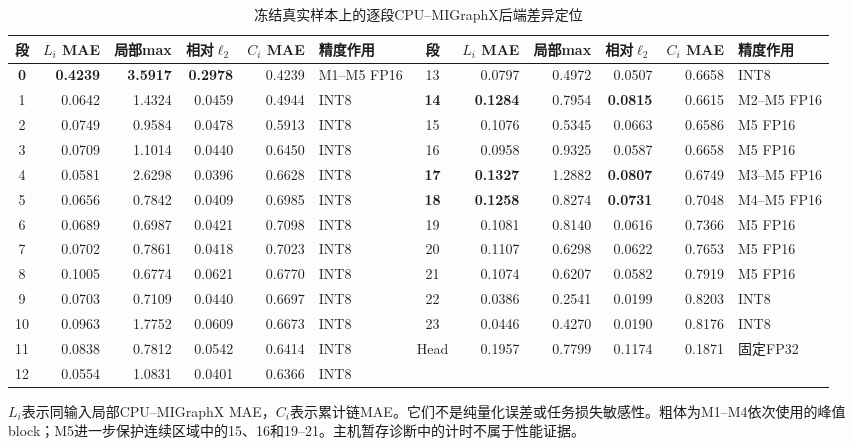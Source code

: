 \documentclass[conference]{IEEEtran}
\begin{document}
\begin{table}[t]
\caption{冻结真实样本上的逐段CPU--MIGraphX后端差异定位}
\label{tab:localization_cn}
\centering
\scriptsize
\begin{tabular}{crrrrl@{\qquad}crrrrl}
\toprule
段 & $L_i$ MAE & 局部max & 相对$\ell_2$ & $C_i$ MAE & 精度作用 & 段 & $L_i$ MAE & 局部max & 相对$\ell_2$ & $C_i$ MAE & 精度作用 \\
\midrule
\textbf{0} & \textbf{0.4239} & \textbf{3.5917} & \textbf{0.2978} & 0.4239 & M1--M5 FP16 & 13 & 0.0797 & 0.4972 & 0.0507 & 0.6658 & INT8 \\
1 & 0.0642 & 1.4324 & 0.0459 & 0.4944 & INT8 & \textbf{14} & \textbf{0.1284} & 0.7954 & \textbf{0.0815} & 0.6615 & M2--M5 FP16 \\
2 & 0.0749 & 0.9584 & 0.0478 & 0.5913 & INT8 & 15 & 0.1076 & 0.5345 & 0.0663 & 0.6586 & M5 FP16 \\
3 & 0.0709 & 1.1014 & 0.0440 & 0.6450 & INT8 & 16 & 0.0958 & 0.9325 & 0.0587 & 0.6658 & M5 FP16 \\
4 & 0.0581 & 2.6298 & 0.0396 & 0.6628 & INT8 & \textbf{17} & \textbf{0.1327} & 1.2882 & \textbf{0.0807} & 0.6749 & M3--M5 FP16 \\
5 & 0.0656 & 0.7842 & 0.0409 & 0.6985 & INT8 & \textbf{18} & \textbf{0.1258} & 0.8274 & \textbf{0.0731} & 0.7048 & M4--M5 FP16 \\
6 & 0.0689 & 0.6987 & 0.0421 & 0.7098 & INT8 & 19 & 0.1081 & 0.8140 & 0.0616 & 0.7366 & M5 FP16 \\
7 & 0.0702 & 0.7861 & 0.0418 & 0.7023 & INT8 & 20 & 0.1107 & 0.6298 & 0.0622 & 0.7653 & M5 FP16 \\
8 & 0.1005 & 0.6774 & 0.0621 & 0.6770 & INT8 & 21 & 0.1074 & 0.6207 & 0.0582 & 0.7919 & M5 FP16 \\
9 & 0.0703 & 0.7109 & 0.0440 & 0.6697 & INT8 & 22 & 0.0386 & 0.2541 & 0.0199 & 0.8203 & INT8 \\
10 & 0.0963 & 1.7752 & 0.0609 & 0.6673 & INT8 & 23 & 0.0446 & 0.4270 & 0.0190 & 0.8176 & INT8 \\
11 & 0.0838 & 0.7812 & 0.0542 & 0.6414 & INT8 & Head & 0.1957 & 0.7799 & 0.1174 & 0.1871 & 固定FP32 \\
12 & 0.0554 & 1.0831 & 0.0401 & 0.6366 & INT8 & & & & & & \\
\bottomrule
\end{tabular}
\vspace{2pt}
\parbox{0.96\textwidth}{\scriptsize $L_i$表示同输入局部CPU--MIGraphX MAE，$C_i$表示累计链MAE。它们不是纯量化误差或任务损失敏感性。粗体为M1--M4依次使用的峰值block；M5进一步保护连续区域中的15、16和19--21。主机暂存诊断中的计时不属于性能证据。}
\end{table}
\end{document}

